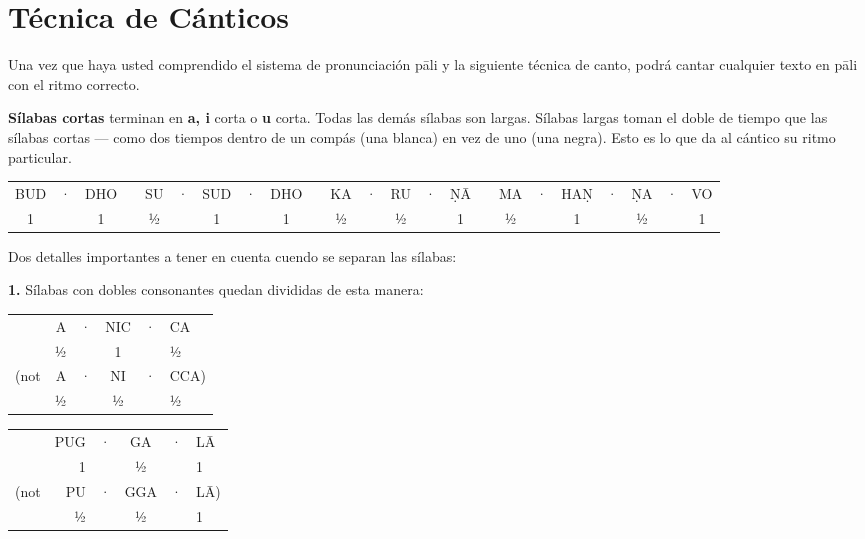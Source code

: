 \section{Técnica de Cánticos}

Una vez que haya usted comprendido el sistema de pronunciación pāli y la siguiente técnica de canto, podrá cantar cualquier texto en pāli con el ritmo correcto.

\textbf{Sílabas cortas} terminan en \textbf{a, i} corta o
\textbf{u} corta. Todas las demás sílabas son largas.
Sílabas largas toman el doble de tiempo que las sílabas cortas --- como dos tiempos dentro de un compás (una blanca) en vez de uno (una negra). Esto es lo que da al cántico su ritmo particular.

\begin{centering}
	
	{\setlength{\tabcolsep}{1.8pt}%
		\begin{tabular}{ccc c ccccc c ccccc c ccccccc}
			BUD & · & DHO & \hsp & SU & · & SUD & · & DHO & \hsp & KA & · & RU & · & ṆĀ & \hsp & MA & · & HAṆ & · & ṆA & · & VO\\
			1  &   & 1   &      & ½  &   & 1   &   & 1   &      & ½  &   & ½  &   & 1  &      & ½  &   & 1   &   & ½  &   & 1\\
		\end{tabular}%
	}
	
\end{centering}

Dos detalles importantes a tener en cuenta cuendo se separan las sílabas:

\textbf{1.} Sílabas con dobles consonantes quedan divididas de esta manera:

\begin{centering}
	
	\begin{minipage}{0.8\linewidth}
		\begin{multicols}{2}
			\setlength{\tabcolsep}{1.8pt}%
			
			\begin{tabular}{rrcccl}
				& A & · & NIC & · & CA   \\
				& ½ &   &  1  &   & ½    \\
				(not & A & · & NI  & · & CCA) \\
				& ½ &   & ½   &   & ½    \\
			\end{tabular}
			
			\columnbreak
			
			\begin{tabular}{rrcccl}
				& PUG & · & GA  & · & LĀ \\
				&  1  &   &  ½  &   &  1 \\
				(not & PU  & · & GGA & · & LĀ)\\
				&  ½  &   &  ½  &   &  1 \\
			\end{tabular}
			
		\end{multicols}
	\end{minipage}
	
\end{centering}

